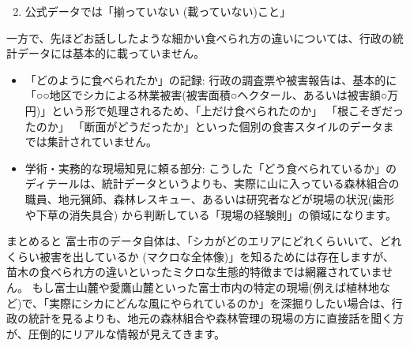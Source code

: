 \documentclass[a4paper, 11pt]{jsarticle}
\begin{document}
\begin{enumerate}
    \setcounter{enumi}{1}
    \item 公式データでは「揃っていない (載っていない)こと」
\end{enumerate}
一方で、先ほどお話ししたような細かい食べられ方の違いについては、行政の統計データには基本的に載っていません。
\begin{itemize}
    \item 「どのように食べられたか」の記録: 行政の調査票や被害報告は、基本的に「○○地区でシカによる林業被害(被害面積○ヘクタール、あるいは被害額○万円)」という形で処理されるため、「上だけ食べられたのか」 「根こそぎだったのか」 「断面がどうだったか」といった個別の食害スタイルのデータまでは集計されていません。
    \item 学術・実務的な現場知見に頼る部分: こうした「どう食べられているか」のディテールは、統計データというよりも、実際に山に入っている森林組合の職員、地元猟師、森林レスキュー、あるいは研究者などが現場の状況(歯形や下草の消失具合) から判断している「現場の経験則」の領域になります。
\end{itemize}
まとめると
富士市のデータ自体は、「シカがどのエリアにどれくらいいて、どれくらい被害を出しているか (マクロな全体像)」を知るためには存在しますが\cite{ref4}、苗木の食べられ方の違いといったミクロな生態的特徴までは網羅されていません。
もし富士山麓や愛鷹山麓といった富士市内の特定の現場(例えば植林地など)で、「実際にシカにどんな風にやられているのか」を深掘りしたい場合は、行政の統計を見るよりも、地元の森林組合や森林管理の現場の方に直接話を聞く方が、圧倒的にリアルな情報が見えてきます。
\end{document}
